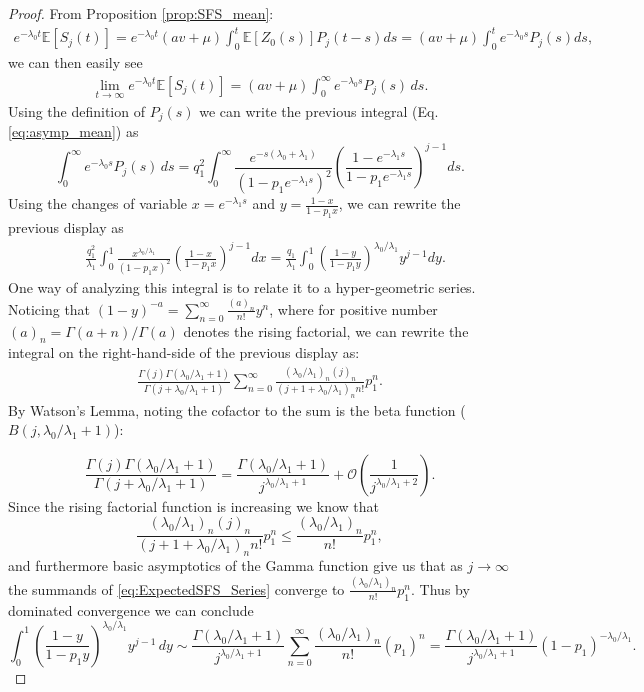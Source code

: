 \documentclass{article}
\numberwithin{equation}{section}
\begin{document}
\begin{proof}
  From Proposition \ref{prop:SFS_mean}:
  \begin{align}
    e^{-\lambda_0t}\mathbb{E}[S_j(t)]= e^{-\lambda_0t}(av+\mu)\int_0^t\mathbb{E}[Z_0(s)]P_j(t-s)ds=(av+\mu)\int_0^t e^{-\lambda_0 s}P_j(s)ds,\label{eq:exact_mean_driver_sfs}
\end{align}
we can then easily see
\begin{align}
  \lim_{t\to\infty}e^{-\lambda_0t}\mathbb{E}[S_j(t)]=(av+\mu)\int_0^\infty e^{-\lambda_0 s}P_j(s)\,ds.\label{eq:asymp_mean}
\end{align}
Using the definition of $P_j(s)$ we can write the previous integral (Eq. \ref{eq:asymp_mean}) as
$$
\int_0^\infty e^{-\lambda_0 s}P_j(s)\,ds=q_1^2\int_0^\infty \frac{e^{-s(\lambda_0+\lambda_1)}}{(1-p_1e^{-\lambda_1s})^2}\left(\frac{1-e^{-\lambda_1s}}{1-p_1e^{-\lambda_1s}}\right)^{j-1}ds.
$$
Using the changes of variable $x=e^{-\lambda_1 s}$ and $y=\frac{1-x}{1-p_1x}$, we can rewrite the previous display as
\begin{align}
&\frac{q_1^2}{\lambda_1}\int_0^1\frac{x^{\lambda_0/\lambda_1}}{(1-p_1x)^2}\left(\frac{1-x}{1-p_1x}\right)^{j-1}dx=\frac{q_1}{\lambda_1}\int_0^1\left(\frac{1-y}{1-p_1y}\right)^{\lambda_0/\lambda_1}y^{j-1}dy.\label{eq:SFS_mean_integral}
\end{align}
One way of analyzing this integral is to relate it to a hyper-geometric series. Noticing that $(1-y)^{-a}=\sum_{n=0}^\infty \frac{(a)_{n}}{n!}y^n$, where for positive number $(a)_{n}=\Gamma(a+n)/\Gamma(a)$ denotes the rising factorial, we can rewrite the integral on the right-hand-side of the previous display as:
\begin{align}
    \label{eq:ExpectedSFS_Series}
\frac{\Gamma(j)\Gamma(\lambda_0/\lambda_1+1)}{\Gamma(j+\lambda_0/\lambda_1+1)}\sum_{n=0}^\infty \frac{(\lambda_0/\lambda_1)_{n}(j)_{n}}{(j+1+\lambda_0/\lambda_1)_{n}n!}p_1^n.
\end{align}
By Watson's Lemma, noting the cofactor to the sum is the beta function ($B(j,\lambda_0/\lambda_1+1)$):

\[\frac{\Gamma(j)\Gamma(\lambda_0/\lambda_1+1)}{\Gamma(j+\lambda_0/\lambda_1+1)}=\frac{\Gamma(\lambda_0/\lambda_1+1)}{j^{\lambda_0/\lambda_1+1}}+\mathcal{O}\left(\frac{1}{j^{\lambda_0/\lambda_1+2}}\right).\]
Since the rising factorial function is increasing we know that
$$
\frac{(\lambda_0/\lambda_1)_{n}(j)_{n}}{(j+1+\lambda_0/\lambda_1)_{n}n!}p_1^n\leq \frac{(\lambda_0/\lambda_1)_n}{n!}p_1^n,
$$
and furthermore basic asymptotics of the Gamma function give us that as $j\to\infty$ the summands of \eqref{eq:ExpectedSFS_Series} converge to $\frac{(\lambda_0/\lambda_1)_n}{n!}p_1^n.$
Thus by dominated convergence we can conclude
\[\int_0^1 \left(\frac{1-y}{1-p_1y}\right)^{\lambda_0/\lambda_1}y^{j-1}\,dy\sim \frac{\Gamma(\lambda_0/\lambda_1+1)}{j^{\lambda_0/\lambda_1+1}}\sum_{n=0}^\infty \frac{(\lambda_0/\lambda_1)_n}{n!}(p_1)^n=\frac{\Gamma(\lambda_0/\lambda_1+1)}{j^{\lambda_0/\lambda_1+1}}(1-p_1)^{-\lambda_0/\lambda_1}.\]


\end{proof}
\end{document}
